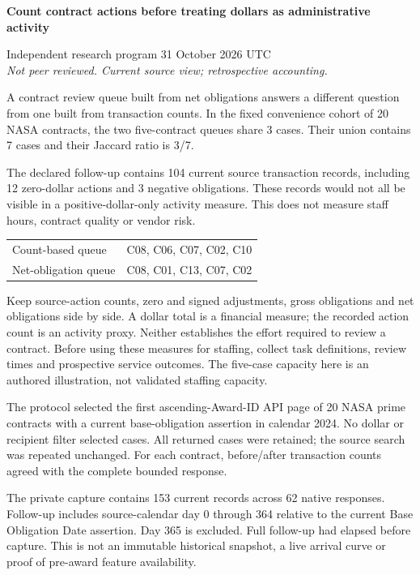 \documentclass[11pt,letterpaper]{article}
\newcommand{\heading}[1]{\vspace{5pt}{\large\bfseries #1}\par}
\newcommand{\BoundDQ}{20}
\newcommand{\BoundDR}{3}
\newcommand{\BoundDS}{7}
\newcommand{\BoundDT}{3/7}
\newcommand{\BoundDU}{104}
\newcommand{\BoundDV}{12}
\newcommand{\BoundDW}{3}
\newcommand{\BoundDX}{C08, C06, C07, C02, C10}
\newcommand{\BoundDY}{C08, C01, C13, C07, C02}
\newcommand{\BoundDZ}{20}
\newcommand{\BoundEA}{153}
\newcommand{\BoundEB}{62}
\begin{document}
{\LARGE\bfseries Count contract actions before treating dollars as administrative activity\par}
\vspace{4pt}
Independent research program \hfill 31 October 2026 UTC\\
\textit{Not peer reviewed. Current source view; retrospective accounting.}

\heading{Decision and practical finding}
A contract review queue built from net obligations answers a different question from one built from transaction counts. In the fixed convenience cohort of \BoundDQ{} NASA contracts, the two five-contract queues share \BoundDR{} cases. Their union contains \BoundDS{} cases and their Jaccard ratio is \BoundDT{}.

The declared follow-up contains \BoundDU{} current source transaction records, including \BoundDV{} zero-dollar actions and \BoundDW{} negative obligations. These records would not all be visible in a positive-dollar-only activity measure. This does not measure staff hours, contract quality or vendor risk.

\begin{tabular}{@{}p{1.38in}p{5.15in}@{}}
\toprule
Count-based queue & \BoundDX{}\\
Net-obligation queue & \BoundDY{}\\
\bottomrule
\end{tabular}

\heading{Recommended use}
Keep source-action counts, zero and signed adjustments, gross obligations and net obligations side by side. A dollar total is a financial measure; the recorded action count is an activity proxy. Neither establishes the effort required to review a contract. Before using these measures for staffing, collect task definitions, review times and prospective service outcomes. The five-case capacity here is an authored illustration, not validated staffing capacity.

\heading{Fixed scope and timing}
The protocol selected the first ascending-Award-ID API page of \BoundDZ{} NASA prime contracts with a current base-obligation assertion in calendar 2024. No dollar or recipient filter selected cases. All returned cases were retained; the source search was repeated unchanged. For each contract, before/after transaction counts agreed with the complete bounded response.

The private capture contains \BoundEA{} current records across \BoundEB{} native responses. Follow-up includes source-calendar day 0 through 364 relative to the current Base Obligation Date assertion. Day 365 is excluded. Full follow-up had elapsed before capture. This is not an immutable historical snapshot, a live arrival curve or proof of pre-award feature availability.
\end{document}

